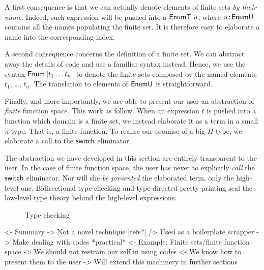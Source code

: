 A first consequence is that we can actually denote elements of finite
sets \emph{by their name}. Indeed, such expression will be pushed into
a $\EnumT{u}$, where $\Bhab{u}{\EnumU}$ contains all the names
populating the finite set. It is therefore easy to elaborate a name
into the corresponding index.

A second consequence concerns the definition of a finite set. We can
abstract away the details of code and use a familiar syntax
instead. Hence, we use the syntax $\Enum\: [t_1 \ldots t_n]$ to denote
the finite sets composed by the named elements $t_1$, \ldots,
$t_n$. The translation to elements of $\EnumU$ is straightforward.


Finally, and more importantly, we are able to present our user an
abstraction of \emph{finite} function space. This work as follow. When
an expression $t$ is pushed into a function which domain is a finite
set, we instead elaborate it as a term in a small $\pi$-type. That is,
a finite function. To realise our promise of a big $\Pi$-type, we
elaborate a call to the $\F{switch}$ eliminator. 

The abstraction we have developed in this section are entirely
transparent to the user. In the case of finite function space, the
user has never to explicitly \emph{call} the $\F{switch}$
eliminator. Nor will she \emph{be presented} the elaborated term, only
the high-level one. Bidirectional type-checking and type-directed
pretty-printing seal the low-level type theory behind the high-level
expressions.


\begin{figure}

\caption{Type checking}
\label{fig:type-checking}
\end{figure}

\begin{wstructure}
<- Summary
    -> Not a novel technique [refs?]
        /> Used as a boilerplate scrapper
    -> Make dealing with codes *practical*
        <- Example: Finite sets/finite function space
        -> We should not restrain our self in using codes
            <- We know how to present them to the user
-> Will extend this machinery in further sections
\end{wstructure}

